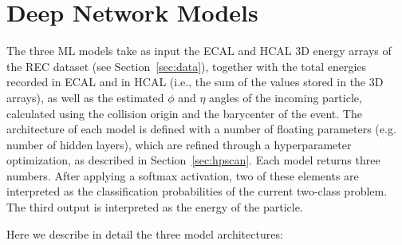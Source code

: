 \section{Deep Network Models}

The three ML models take as input the ECAL and HCAL 3D energy arrays of the REC dataset (see Section~\ref{sec:data}), together with the total energies recorded in ECAL and in HCAL (i.e., the sum of the values stored in the 3D arrays), as well as the estimated $\phi$ and $\eta$ angles of the incoming particle, calculated using the collision origin and the barycenter of the event. The architecture of each model is defined with a number of floating parameters (e.g. number of hidden layers), which are refined through a hyperparameter optimization, as described in Section~\ref{sec:hpscan}. Each model returns three numbers. After applying a softmax activation, two of these elements are interpreted as the classification probabilities of the current two-class problem. The third output is interpreted as the energy of the particle.

Here we describe in detail the three model architectures:

